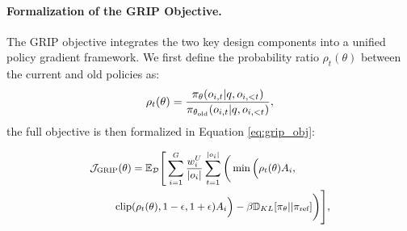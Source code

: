 

\paragraph{Formalization of the GRIP Objective.}

The GRIP objective integrates the two key design components into a unified policy gradient framework. We first define the probability ratio $\rho_t(\theta)$ between the current and old policies as:
\begin{equation}
\setlength{\abovedisplayskip}{2pt}
\setlength{\belowdisplayskip}{2pt}
    \rho_t(\theta) = \frac{\pi_\theta(o_{i,t}|q, o_{i,<t})}{\pi_{\theta_{\text{old}}}(o_{i,t}|q, o_{i,<t})},
    \label{eq:ratio_def}
\end{equation}
the full objective is then formalized in Equation \ref{eq:grip_obj}:


\begin{equation}
\small %
\setlength{\abovedisplayskip}{2pt}
\setlength{\belowdisplayskip}{2pt}
\begin{aligned}
\mathcal{J}_{\text{GRIP}}(\theta) &= \mathbb{E}_{\mathcal{D}} \Bigg[ \sum_{i=1}^{G} \frac{w_i^U}{|o_i|} \sum_{t=1}^{|o_i|} \bigg( \min \Big( \rho_t(\theta) A_i, \\
& \hspace{-5mm}  \text{clip}(\rho_t(\theta), 1-\epsilon, 1+\epsilon) A_i \Big) - \beta \mathbb{D}_{KL} [\pi_\theta || \pi_{\text{ref}}] \bigg) \Bigg],
\end{aligned}
\label{eq:grip_obj}
\end{equation}

